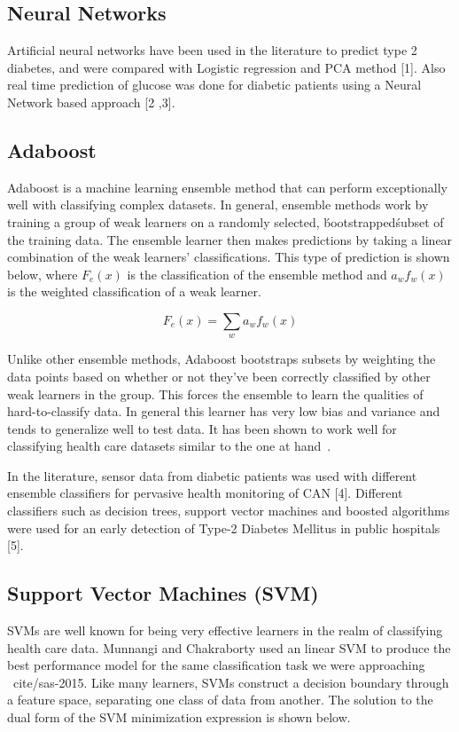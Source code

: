 \documentclass[conference]{IEEEtran}
\begin{document}
\subsection{Neural Networks}

Artificial neural networks have been used in the literature to predict type 2 diabetes, and were compared with Logistic regression and PCA method [1]. Also real time prediction of glucose was done for diabetic patients using a Neural Network based approach [2 ,3]. 

\subsection{Adaboost}
Adaboost is a machine learning ensemble method that can perform exceptionally well with classifying complex datasets. In general, ensemble methods work by training a group of weak learners on a randomly selected, \'bootstrapped\' subset of the training data. The ensemble learner then makes predictions by taking a linear combination of the weak learners' classifications. This type of prediction is shown below, where $F_{e}(x)$ is the classification of the ensemble method and $a_{w}f_{w}(x)$ is the weighted classification of a weak learner.

\[
	F_{e}(x) = \sum_{w} a_{w}f_{w}(x)
\]

Unlike other ensemble methods, Adaboost bootstraps subsets by weighting the data points based on whether or not they've been correctly classified by other weak learners in the group. This forces the ensemble to learn the qualities of hard-to-classify data. In general this learner has very low bias and variance and tends to generalize well to test data. It has been shown to work well for classifying health care datasets similar to the one at hand~\cite{adaboost-breast-cancer}.

In the literature, sensor data from diabetic patients was used with different ensemble classifiers for pervasive health monitoring of CAN [4]. Different classifiers such as decision trees, support vector machines and boosted algorithms were used for an early detection of Type-2 Diabetes Mellitus in public hospitals [5].

\subsection{Support Vector Machines (SVM)}
SVMs are well known for being very effective learners in the realm of classifying health care data. Munnangi and Chakraborty used an linear SVM to produce the best performance model for the same classification task we were approaching ~cite/{sas-2015}. Like many learners, SVMs construct a decision boundary through a feature space, separating one class of data from another. The solution to the dual form of the SVM minimization expression is shown below.
\end{document}

